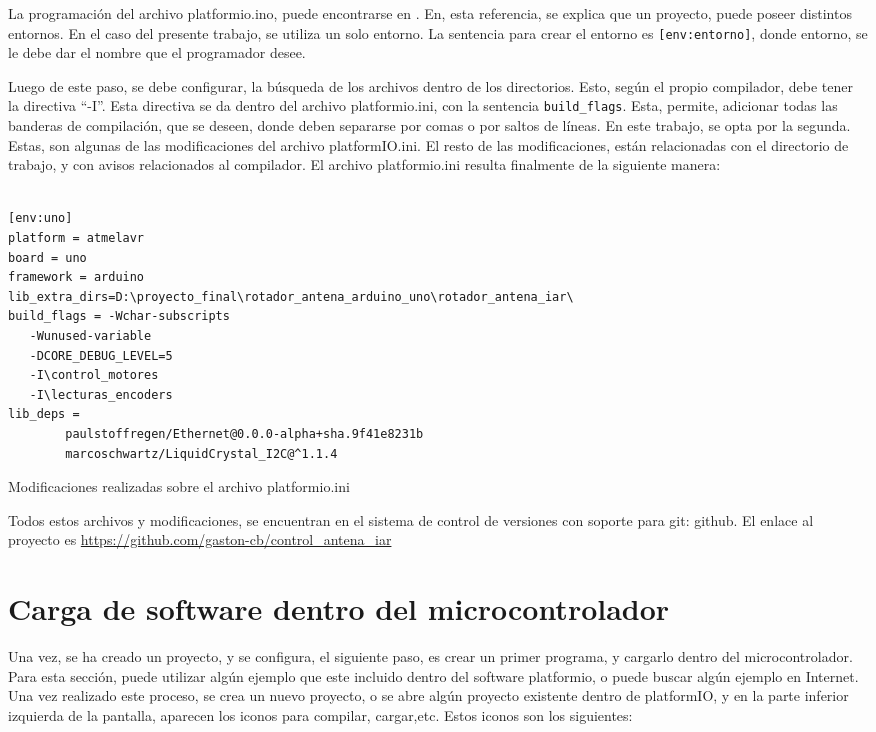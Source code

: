 La programación del archivo platformio.ino, puede encontrarse en \cite{platformio}. En, esta referencia, se explica que un proyecto, puede poseer distintos entornos. En el caso del presente trabajo, se utiliza un solo entorno. La sentencia para crear el entorno es \texttt{[env:entorno]}, donde entorno, se le debe dar el nombre que el programador desee.  

Luego de este paso, se debe configurar, la búsqueda de los archivos dentro de los directorios. Esto, según el propio compilador, debe tener la directiva ``-I''. Esta directiva se da dentro del archivo platformio.ini, con la sentencia \texttt{build_flags}. Esta, permite, adicionar todas las banderas de compilación, que se deseen, donde deben separarse por comas o por saltos de líneas. En este trabajo, se opta por la segunda. Estas, son algunas de las modificaciones del archivo platformIO.ini. El resto de las modificaciones, están relacionadas con el directorio de trabajo, y con avisos relacionados al compilador. El archivo platformio.ini resulta finalmente de la siguiente manera: 

\begin{listing}[ht!]
	\begin{verbatim}
		
[env:uno]
platform = atmelavr
board = uno
framework = arduino
lib_extra_dirs=D:\proyecto_final\rotador_antena_arduino_uno\rotador_antena_iar\
build_flags = -Wchar-subscripts
   -Wunused-variable 
   -DCORE_DEBUG_LEVEL=5 
   -I\control_motores
   -I\lecturas_encoders		
lib_deps = 
		paulstoffregen/Ethernet@0.0.0-alpha+sha.9f41e8231b
		marcoschwartz/LiquidCrystal_I2C@^1.1.4
	\end{verbatim}
\caption{Modificaciones realizadas sobre el archivo platformio.ini}
\end{listing}

Todos estos archivos y modificaciones, se encuentran en el sistema de control de versiones con soporte para git: github. El enlace al proyecto es \url{https://github.com/gaston-cb/control_antena_iar}


\section{Carga de software dentro del microcontrolador} 

Una vez, se ha creado un proyecto, y se configura, el siguiente paso, es crear un primer programa, y cargarlo dentro del microcontrolador. Para esta sección, puede utilizar algún ejemplo que este incluido dentro del software platformio, o puede buscar algún ejemplo en Internet. Una vez realizado este proceso, se crea un nuevo proyecto, o se abre algún proyecto existente dentro de platformIO, y en la parte inferior izquierda de la pantalla, aparecen los iconos para compilar, cargar,etc. Estos iconos son los siguientes: 

